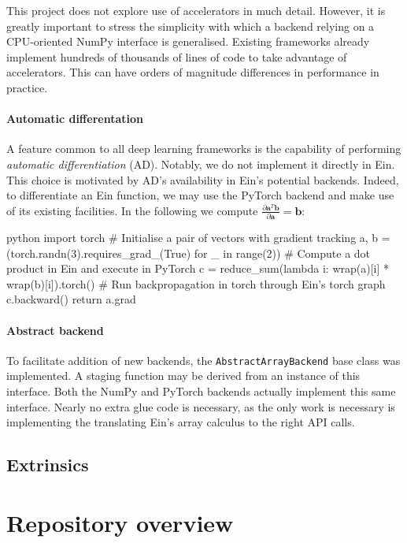 This project does not explore use of accelerators in much detail. However, it is greatly important to stress the simplicity with which a backend relying on a CPU-oriented NumPy interface is generalised. Existing frameworks already implement hundreds of thousands of lines of code to take advantage of accelerators. This can have orders of magnitude differences in performance in practice.

\paragraph{Automatic differentation} A feature common to all deep learning frameworks is the capability of performing \textit{automatic differentiation} (AD). Notably, we do not implement it directly in Ein. This choice is motivated by AD's availability in Ein's potential backends. Indeed, to differentiate an Ein function, we may use the PyTorch backend and make use of its existing facilities. In the following we compute $\frac{\partial \mathbf{a}^T \mathbf{b}}{\partial \mathbf{a}} = \mathbf{b}$:
\begin{center}
\begin{cminted}{python}
import torch
# Initialise a pair of vectors with gradient tracking
a, b = (torch.randn(3).requires_grad_(True) for _ in range(2))
# Compute a dot product in Ein and execute in PyTorch
c = reduce_sum(lambda i: wrap(a)[i] * wrap(b)[i]).torch()
# Run backpropagation in torch through Ein's torch graph
c.backward()
return a.grad
\end{cminted}
\end{center}

\paragraph{Abstract backend} To facilitate addition of new backends, the \texttt{AbstractArrayBackend} base class was implemented. A staging function may be derived from an instance of this interface. Both the NumPy and PyTorch backends actually implement this same interface. Nearly no extra glue code is necessary, as the only work is necessary is implementing the translating Ein's array calculus to the right API calls.

\subsection{Extrinsics}

\todothis

\section{Repository overview}


